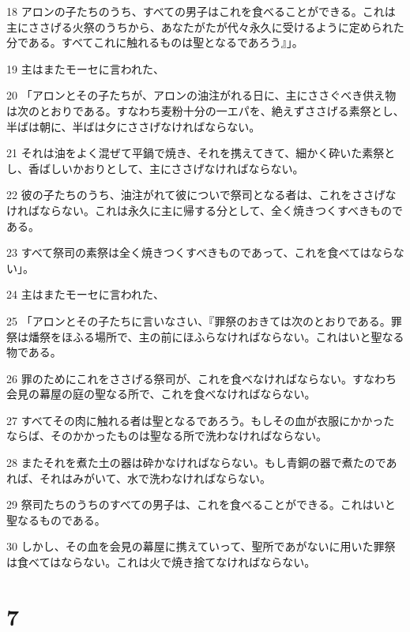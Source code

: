 \par 18 アロンの子たちのうち、すべての男子はこれを食べることができる。これは主にささげる火祭のうちから、あなたがたが代々永久に受けるように定められた分である。すべてこれに触れるものは聖となるであろう』」。
\par 19 主はまたモーセに言われた、
\par 20 「アロンとその子たちが、アロンの油注がれる日に、主にささぐべき供え物は次のとおりである。すなわち麦粉十分の一エパを、絶えずささげる素祭とし、半ばは朝に、半ばは夕にささげなければならない。
\par 21 それは油をよく混ぜて平鍋で焼き、それを携えてきて、細かく砕いた素祭とし、香ばしいかおりとして、主にささげなければならない。
\par 22 彼の子たちのうち、油注がれて彼についで祭司となる者は、これをささげなければならない。これは永久に主に帰する分として、全く焼きつくすべきものである。
\par 23 すべて祭司の素祭は全く焼きつくすべきものであって、これを食べてはならない」。
\par 24 主はまたモーセに言われた、
\par 25 「アロンとその子たちに言いなさい、『罪祭のおきては次のとおりである。罪祭は燔祭をほふる場所で、主の前にほふらなければならない。これはいと聖なる物である。
\par 26 罪のためにこれをささげる祭司が、これを食べなければならない。すなわち会見の幕屋の庭の聖なる所で、これを食べなければならない。
\par 27 すべてその肉に触れる者は聖となるであろう。もしその血が衣服にかかったならば、そのかかったものは聖なる所で洗わなければならない。
\par 28 またそれを煮た土の器は砕かなければならない。もし青銅の器で煮たのであれば、それはみがいて、水で洗わなければならない。
\par 29 祭司たちのうちのすべての男子は、これを食べることができる。これはいと聖なるものである。
\par 30 しかし、その血を会見の幕屋に携えていって、聖所であがないに用いた罪祭は食べてはならない。これは火で焼き捨てなければならない。

\chapter{7}

